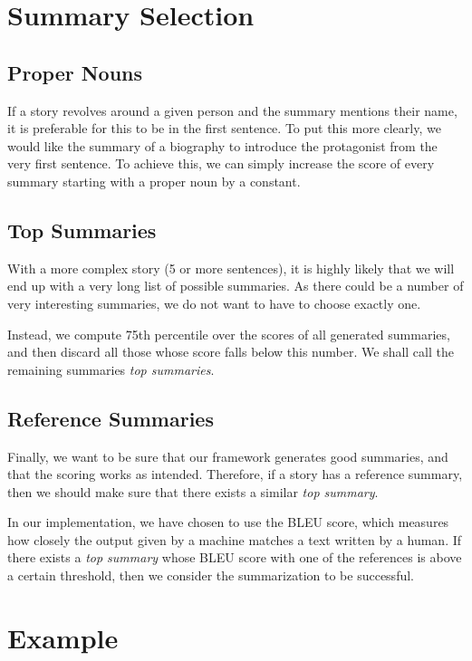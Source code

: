 \section{Summary Selection}

\subsection{Proper Nouns}

If a story revolves around a given person and the summary mentions their name, it is preferable for this to be in the first sentence. To put this more clearly, we would like the summary of a biography to introduce the protagonist from the very first sentence. To achieve this, we can simply increase the score of every summary starting with a proper noun by a constant.

\subsection{Top Summaries}

With a more complex story (5 or more sentences), it is highly likely that we will end up with a very long list of possible summaries. As there could be a number of very interesting summaries, we do not want to have to choose exactly one.

Instead, we compute 75th percentile over the scores of all generated summaries, and then discard all those whose score falls below this number. We shall call the remaining summaries \textit{top summaries}.

\subsection{Reference Summaries}

Finally, we want to be sure that our framework generates good summaries, and that the scoring works as intended. Therefore, if a story has a reference summary, then we should make sure that there exists a similar \textit{top summary}.

In our implementation, we have chosen to use the BLEU score, which measures how closely the output given by a machine matches a text written by a human. If there exists a \textit{top summary} whose BLEU score with one of the references is above a certain threshold, then we consider the summarization to be successful.

\section{Example}
\label{sec:postprocess_example}

